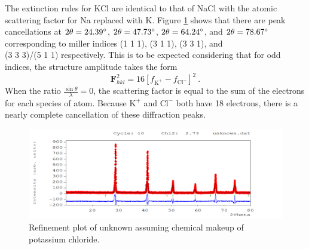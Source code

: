 \documentclass[12pt]{article}
\begin{document}
\noindent
The extinction rules for KCl are identical to that of NaCl with the atomic scattering factor for Na replaced with K. Figure \ref{fig:unknown} shows that there are peak cancellations at $2\theta = 24.39\degree$, $2\theta = 47.73\degree$, $2\theta = 64.24\degree$, and $2\theta = 78.67\degree$ corresponding to miller indices (1 1 1), (3 1 1), (3 3 1), and \\
(3 3 3)/(5 1 1) respectively. This is to be expected considering that for odd indices, the structure amplitude takes the form
\begin{equation}
\textbf{F}^2_{hkl}=16\left[ f_{\text{K}^+} - f_{\text{Cl}^-} \right]^2\:.
\end{equation}
When the ratio $\frac{\sin\theta}{\lambda} = 0$, the scattering factor is equal to the sum of the electrons for each species of atom. Because $\text{K}^+$ and $\text{Cl}^-$ both have 18 electrons, there is a nearly complete cancellation of these diffraction peaks.


\begin{figure}[h!]\centering
 \quad \includegraphics[width=1\textwidth]{unknown}
\caption{Refinement plot of unknown assuming chemical makeup of potassium chloride.}
\label{fig:unknown}
\end{figure}
\end{document}
